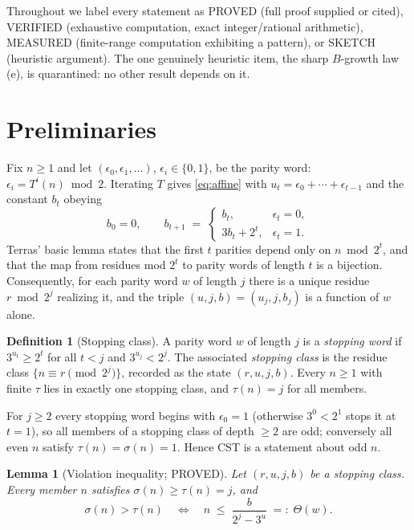 \documentclass[10pt]{article}
\newtheorem{lemma}[theorem]{Lemma}
\theoremstyle{definition}
\newtheorem{definition}[theorem]{Definition}
\theoremstyle{remark}
\begin{document}
Throughout we label every statement as PROVED (full proof supplied or cited),
VERIFIED (exhaustive computation, exact integer/rational arithmetic), MEASURED
(finite-range computation exhibiting a pattern), or SKETCH (heuristic
argument). The one genuinely heuristic item, the sharp $B$-growth law (e), is
quarantined: no other result depends on it.

\section{Preliminaries}\label{sec:prelim}

Fix $n \ge 1$ and let $(\epsilon_0, \epsilon_1, \dots)$,
$\epsilon_i \in \{0,1\}$, be the parity word: $\epsilon_i = T^{i}(n) \bmod 2$.
Iterating $T$ gives \eqref{eq:affine} with $u_t = \epsilon_0 + \cdots +
\epsilon_{t-1}$ and the constant $b_t$ obeying
\begin{equation}\label{eq:brec}
b_0 = 0, \qquad
b_{t+1} \;=\;
\begin{cases}
 b_t, & \epsilon_t = 0,\\
 3 b_t + 2^{t}, & \epsilon_t = 1.
\end{cases}
\end{equation}
Terras' basic lemma \cite{Terras1976} states that the first $t$ parities
depend only on $n \bmod 2^{t}$, and that the map from residues mod $2^{t}$ to
parity words of length $t$ is a bijection. Consequently, for each parity word
$w$ of length $j$ there is a unique residue $r \bmod 2^{j}$ realizing it, and
the triple $(u, j, b) = (u_j, j, b_j)$ is a function of $w$ alone.

\begin{definition}[Stopping class]
A parity word $w$ of length $j$ is a \emph{stopping word} if
$3^{u_t} \ge 2^{t}$ for all $t < j$ and $3^{u_j} < 2^{j}$. The associated
\emph{stopping class} is the residue class $\{ n \equiv r \pmod{2^{j}} \}$,
recorded as the state $(r, u, j, b)$. Every $n \ge 1$ with finite $\tau$ lies
in exactly one stopping class, and $\tau(n) = j$ for all members.
\end{definition}

For $j \ge 2$ every stopping word begins with $\epsilon_0 = 1$ (otherwise
$3^{0} < 2^{1}$ stops it at $t=1$), so all members of a stopping class of
depth $\ge 2$ are odd; conversely all even $n$ satisfy
$\tau(n)=\sigma(n)=1$. Hence CST is a statement about odd $n$.

\begin{lemma}[Violation inequality; PROVED]\label{lem:viol}
Let $(r,u,j,b)$ be a stopping class. Every member $n$ satisfies
$\sigma(n) \ge \tau(n) = j$, and
\[
\sigma(n) > \tau(n)
\quad\Longleftrightarrow\quad
n \;\le\; \frac{b}{2^{j} - 3^{u}} \;=:\; \Theta(w).
\]
\end{lemma}
\end{document}
